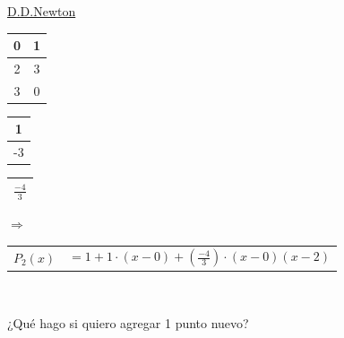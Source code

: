 \underline{D.D.Newton }\\[2\baselineskip]
\begin{tabular}{|c|c|}
\hline 
0 &  1 \\
\hline 
2 & 3  \\ 
\hline 
3 & 0  \\ 
\hline 
\end{tabular} 
\hspace*{-0.19cm}
\begin{tabular}{|c|}
\hline 
1 \\
\hline 
-3 \\
\hline  
\end{tabular}
\hspace*{-0.19cm}
\begin{tabular}{|c|}
\hline 
$ \displaystyle \frac{-4}{3}$ \\
\hline  
\end{tabular}
$\Rightarrow$
\begin{tabular}{cc}
$P_{2}(x)$ &$= 1 + 1 \cdot (x-0) + (\frac{-4}{3}) \cdot (x-0)(x-2)$  \\
\end{tabular} \\
\begin{center}
¿Qué hago si quiero agregar 1 punto nuevo?
\end{center}


\newpage


